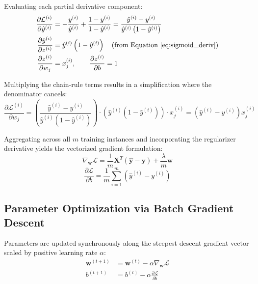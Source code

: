 \documentclass[11pt,a4paper]{article}
\begin{document}
Evaluating each partial derivative component:
\begin{align}
    \frac{\partial \mathcal{L}^{(i)}}{\partial \hat{y}^{(i)}} &= -\frac{y^{(i)}}{\hat{y}^{(i)}} + \frac{1 - y^{(i)}}{1 - \hat{y}^{(i)}} = \frac{\hat{y}^{(i)} - y^{(i)}}{\hat{y}^{(i)}\left(1 - \hat{y}^{(i)}\right)} \\
    \frac{\partial \hat{y}^{(i)}}{\partial z^{(i)}} &= \hat{y}^{(i)}\left(1 - \hat{y}^{(i)}\right) \quad \text{(from Equation~\ref{eq:sigmoid_deriv})} \\
    \frac{\partial z^{(i)}}{\partial w_j} &= x_j^{(i)}, \qquad \frac{\partial z^{(i)}}{\partial b} = 1
\end{align}

Multiplying the chain-rule terms results in a simplification where the denominator cancels:
\begin{equation}
    \frac{\partial \mathcal{L}^{(i)}}{\partial w_j} = \left(\frac{\hat{y}^{(i)} - y^{(i)}}{\hat{y}^{(i)}\left(1 - \hat{y}^{(i)}\right)}\right) \cdot \left(\hat{y}^{(i)}\left(1 - \hat{y}^{(i)}\right)\right) \cdot x_j^{(i)} = \left(\hat{y}^{(i)} - y^{(i)}\right) x_j^{(i)}
\end{equation}

Aggregating across all $m$ training instances and incorporating the regularizer derivative yields the vectorized gradient formulation:
\begin{equation}
    \nabla_{\mathbf{w}} \mathcal{L} = \frac{1}{m} \mathbf{X}^T \left(\hat{\mathbf{y}} - \mathbf{y}\right) + \frac{\lambda}{m} \mathbf{w}
    \label{eq:grad_w}
\end{equation}
\begin{equation}
    \frac{\partial \mathcal{L}}{\partial b} = \frac{1}{m} \sum_{i=1}^m \left(\hat{y}^{(i)} - y^{(i)}\right)
    \label{eq:grad_b}
\end{equation}

\subsection{Parameter Optimization via Batch Gradient Descent}
Parameters are updated synchronously along the steepest descent gradient vector scaled by positive learning rate $\alpha$:
\begin{align}
    \mathbf{w}^{(t+1)} &= \mathbf{w}^{(t)} - \alpha \nabla_{\mathbf{w}} \mathcal{L} \\
    b^{(t+1)} &= b^{(t)} - \alpha \frac{\partial \mathcal{L}}{\partial b}
\end{align}
\end{document}
